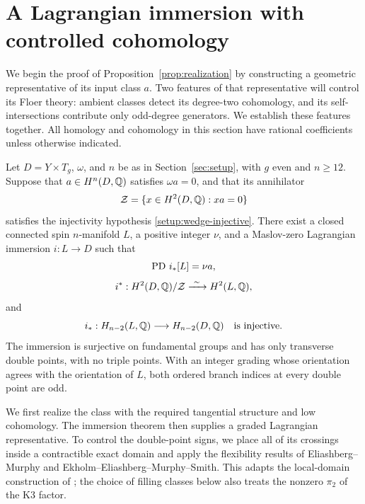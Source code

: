 \section{A Lagrangian immersion with controlled cohomology}
\label{sec:topology}

We begin the proof of Proposition~\ref{prop:realization} by constructing
a geometric representative of its input class $a$.  Two features of that representative will control its
Floer theory: ambient classes detect its degree-two cohomology, and its
self-intersections contribute only odd-degree generators.  We establish
these features together.  All homology and cohomology in this section have
rational coefficients unless otherwise indicated.

\begin{proposition}\label{prop:immersion}
Let $D=Y\times T_g$, $\omega$, and $n$ be as in Section~\ref{sec:setup}, with
$g$ even and $n\geq12$.  Suppose that $a\in H^n(D,\mathbb Q)$ satisfies
$\omega a=0$, and that its annihilator
\[
 \mathcal Z=\{x\in H^2(D,\mathbb Q):xa=0\}
\]
satisfies the injectivity hypothesis \eqref{setup:wedge-injective}.
There exist a closed connected spin $n$-manifold $L$, a positive integer
$\nu$, and a Maslov-zero Lagrangian immersion $i:L\to D$ such that
\begin{equation}\label{topo:class}
 \operatorname{PD}\,i_*[L]=\nu a,
\end{equation}
\begin{equation}\label{topo:h2}
 i^*:H^2(D,\mathbb Q)/\mathcal Z\xrightarrow{\ \sim\ }H^2(L,\mathbb Q),
\end{equation}
and
\begin{equation}\label{topo:push}
 i_*:H_{n-2}(L,\mathbb Q)\longrightarrow H_{n-2}(D,\mathbb Q)
 \quad\text{is injective}.
\end{equation}
The immersion is surjective on fundamental groups and has only transverse
double points, with no triple points.  With an integer grading whose
orientation agrees with the orientation of $L$, both ordered branch
indices at every double point are odd.
\end{proposition}

We first realize the class with the required tangential structure and low
cohomology.  The immersion theorem then supplies a graded Lagrangian
representative.  To control the double-point signs, we place all of its
crossings inside a contractible exact domain and apply the flexibility
results of Eliashberg--Murphy and Ekholm--Eliashberg--Murphy--Smith.  This
adapts the local-domain construction of \cite[Section~3]{A8}; the choice
of filling classes below also treats the nonzero $\pi_2$ of the K3 factor.

